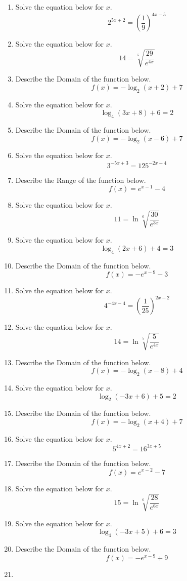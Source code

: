\documentclass[14pt]{extbook}
\begin{document}
\begin{enumerate}
\item{
Solve the equation below for $x$.\[ 2^{5x+2} = \left(\frac{1}{9}\right)^{4x-5} \]} \newpage
\item{
Solve the equation below for $x$.\[  14 = \sqrt[5]{\frac{29}{e^{4x}}} \]} \newpage
\item{
Describe the Domain of the function below.\[ f(x) = -\log_2{(x+2)}+7 \]} \newpage
\item{
Solve the equation below for $x$.\[ \log_{4}{(3x+8)}+6 = 2 \]} \newpage
\item{
Describe the Domain of the function below.\[ f(x) = -\log_2{(x-6)}+7 \]} \newpage
\item{
Solve the equation below for $x$.\[ 3^{-5x+3} = 125^{-2x-4} \]} \newpage
\item{
Describe the Range of the function below.\[ f(x) = e^{x-1}-4 \]} \newpage
\item{
Solve the equation below for $x$.\[  11 = \ln{\sqrt[6]{\frac{30}{e^{3x}}}} \]} \newpage
\item{
Solve the equation below for $x$.\[ \log_{4}{(2x+6)}+4 = 3 \]} \newpage
\item{
Describe the Domain of the function below.\[ f(x) = -e^{x-9}-3 \]} \newpage
\item{
Solve the equation below for $x$.\[ 4^{-4x-4} = \left(\frac{1}{25}\right)^{2x-2} \]} \newpage
\item{
Solve the equation below for $x$.\[  14 = \ln{\sqrt[7]{\frac{5}{e^{4x}}}} \]} \newpage
\item{
Describe the Domain of the function below.\[ f(x) = -\log_2{(x-8)}+4 \]} \newpage
\item{
Solve the equation below for $x$.\[ \log_{2}{(-3x+6)}+5 = 2 \]} \newpage
\item{
Describe the Domain of the function below.\[ f(x) = -\log_2{(x+4)}+7 \]} \newpage
\item{
Solve the equation below for $x$.\[ 5^{4x+2} = 16^{3x+5} \]} \newpage
\item{
Describe the Domain of the function below.\[ f(x) = e^{x-2}-7 \]} \newpage
\item{
Solve the equation below for $x$.\[  15 = \ln{\sqrt[6]{\frac{28}{e^{6x}}}} \]} \newpage
\item{
Solve the equation below for $x$.\[ \log_{4}{(-3x+5)}+6 = 3 \]} \newpage
\item{
Describe the Domain of the function below.\[ f(x) = -e^{x-9}+9 \]} \newpage
\item{
}
\end{enumerate}
\end{document}

